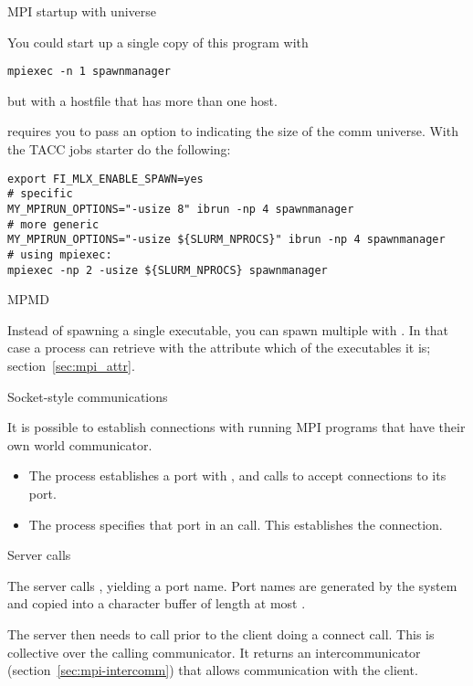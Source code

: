  {MPI startup with universe}

You could start up a single copy of this program with 
\begin{verbatim}
mpiexec -n 1 spawnmanager
\end{verbatim}
but with a hostfile that has more than one host.

\begin{taccnote}
 requires you to pass an option  to
 indicating the size of the comm universe. With the TACC
jobs starter  do the following:
\begin{verbatim}
export FI_MLX_ENABLE_SPAWN=yes
# specific
MY_MPIRUN_OPTIONS="-usize 8" ibrun -np 4 spawnmanager
# more generic
MY_MPIRUN_OPTIONS="-usize ${SLURM_NPROCS}" ibrun -np 4 spawnmanager
# using mpiexec:
mpiexec -np 2 -usize ${SLURM_NPROCS} spawnmanager
\end{verbatim}
\end{taccnote}

 {MPMD}

Instead of spawning a single executable, you can spawn multiple with
.
In that case a process can retrieve with
the attribute
which of the executables it is;
section~\ref{sec:mpi_attr}.

 {Socket-style communications}

It is possible to establish connections with running MPI programs that
have their own world communicator.
\begin{itemize}
\item The  process establishes a port with 
  , and calls  to accept
  connections to its port.
\item The  process specifies that port 
  in an  call. This establishes the connection.
\end{itemize}

 {Server calls}

The server calls , yielding a port name.
Port names are generated by the system and copied into a character
buffer of length at most .

The server then needs to call 
 prior to the client doing a connect call.
This is collective over the calling communicator.
It returns an intercommunicator (section~\ref{sec:mpi-intercomm})
that allows communication with the client.

